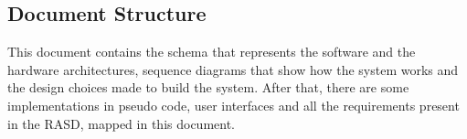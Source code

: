 \subsection{Document Structure}
	This document contains the schema that represents the software and the hardware architectures, sequence diagrams that show how the system works and the design choices made to build the system. After that, there are some implementations in pseudo code, user interfaces and all the requirements present in the RASD, mapped in this document.